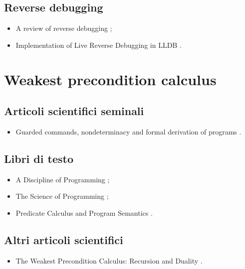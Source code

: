 \subsection*{Reverse debugging}
\begin{itemize}

\item A review of reverse debugging \cite{engblom2012reversedebug};

\item Implementation of Live Reverse Debugging in LLDB \cite{savidis2021reversedebug}.

\end{itemize}

\section*{Weakest precondition calculus}

\subsection*{Articoli scientifici seminali}
\begin{itemize}

\item Guarded commands, nondeterminacy and formal derivation of programs \cite{dijkstra1975wpc}.

\end{itemize}

\subsection*{Libri di testo}
\begin{itemize}

\item A Discipline of Programming \cite{dijkstra1976wpcbook};

\item The Science of Programming \cite{gries1987wpcbook};

\item Predicate Calculus and Program Semantics \cite{dijkstra1990wpcbook}.

\end{itemize}

\subsection*{Altri articoli scientifici}
\begin{itemize}

\item The Weakest Precondition Calculus: Recursion and Duality \cite{bonsangue1994wpc}.

\end{itemize}

